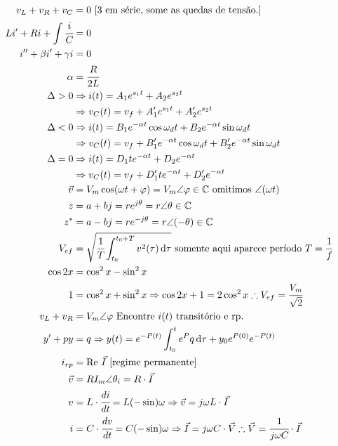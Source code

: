 \documentclass[12pt,a4paper]{article}
\begin{document}
\begin{align}
v_L + v_R + v_C &= 0 \text{ [3 em s\'erie, some as quedas de tens\~ao.]} \\
Li' + Ri + \int \cfrac{i}{C} &= 0 \\
i'' + \beta i' + \gamma i &= 0 \\
\alpha &= \cfrac{R}{2L} \\
\Delta > 0 &\Rightarrow i(t) = A_1 e^{s_1 t} + A_2 e^{s_2 t} \\
&\Rightarrow v_C(t) = v_f + A_1' e^{s_1 t} + A_2' e^{s_2 t} \\
\Delta < 0 &\Rightarrow i(t) = B_1 e^{- \alpha t} \cos \omega_d t + B_2 e^{-\alpha t} \sin \omega_d t \\
&\Rightarrow v_C(t) = v_f + B_1' e^{- \alpha t} \cos \omega_d t + B_2' e^{-\alpha t} \sin \omega_d t \\
\Delta = 0 &\Rightarrow i(t) = D_1 t e^{-\alpha t} + D_2 e^{-\alpha t} \\
&\Rightarrow v_C(t) = v_f + D_1' t e^{-\alpha t} + D_2' e^{-\alpha t} \\
\vec v &= V_m \cos (\omega t + \varphi) = V_m \angle \varphi \in \mathbb{C} \text{ omitimos } \angle (\omega t) \\
z &= a + bj = re^{j\theta} = r \angle \theta \in \mathbb{C} \\
z^* &= a - bj = re^{-j\theta} = r \angle (-\theta) \in \mathbb{C} \\
V_{ef} &= \sqrt{ \cfrac{1}{T} \int_{t_0}^{t_0 + T} v^2(\tau) \,\mathrm{d}\tau } \text{ somente aqui aparece per\'iodo }T = \cfrac{1}{f} \\
\cos 2x &= \cos^2 x - \sin^2 x \\
1 &= \cos^2 x + \sin^2 x \Rightarrow \cos 2x + 1 = 2 \cos^2 x \therefore V_{ef} = \cfrac{V_m}{\sqrt{2}} \\
v_L + v_R &= V_m \angle \varphi \text{ Encontre }i(t) \text{ transit\'orio e rp.} \\
y' + py &= q \Rightarrow y(t) = e^{-P(t)} \int_{t_0}^t e^P q \, \mathrm{d}\tau + y_0 e^{P(0)} e^{-P(t)}   \\
i_{rp} &= \text{Re } \vec I \text{ [regime permanente]} \\
\vec v &= R I_m \angle \theta_i = R \cdot \vec I \\
v &= L \cdot \cfrac{di}{dt} = L (-\sin) \omega \Rightarrow \vec v = j \omega L \cdot \vec I \\
i &= C \cdot \cfrac{dv}{dt} = C (-\sin) \omega \Rightarrow \vec I = j \omega C \cdot \vec V \therefore \vec V = \cfrac{1}{j\omega C}\cdot \vec I \\

\end{align}
\end{document}
